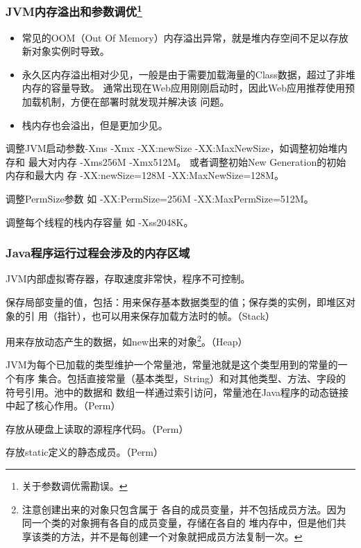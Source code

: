 \documentclass[hyperref={pdfpagelabels=false},compress,table]{beamer} %
\newcommand{\kai}{\CJKfamily{KaiTi}}
\def\Red{\color{red}}
\begin{document}
\begin{frame}[fragile] %
\frametitle{JVM内存溢出和参数调优\footnote{关于参数调优需勘误。}}

\begin{itemize}
\item 常见的OOM（Out Of Memory）内存溢出异常，就是堆内存空间不足以存放新对象实例时导致。
\item 永久区内存溢出相对少见，一般是由于需要加载海量的Class数据，超过了非堆内存的容量导致。
  通常出现在Web应用刚刚启动时，因此Web应用推荐使用预加载机制，方便在部署时就发现并解决该
  问题。
 \item 栈内存也会溢出，但是更加少见。
\end{itemize}

\begin{description}\scriptsize
\item[堆内存优化] 调整JVM启动参数-Xms -Xmx -XX:newSize -XX:MaxNewSize，如调整初始堆内存和
  最大对内存 -Xms256M -Xmx512M。 或者调整初始New Generation的初始内存和最大内
  存 -XX:newSize=128M -XX:MaxNewSize=128M。
 \item[永久区内存优化] 调整PermSize参数   如  -XX:PermSize=256M -XX:MaxPermSize=512M。
 \item[栈内存优化] 调整每个线程的栈内存容量  如  -Xss2048K。
\end{description}
\end{frame}

\begin{frame}[fragile] %
\frametitle{Java程序运行过程会涉及的内存区域}
\begin{description}\kai\small
\item[寄存器] JVM内部虚拟寄存器，存取速度非常快，程序不可控制。
\item[栈] 保存局部变量的值，包括：用来保存基本数据类型的值；保存类的实例，即堆区对象的引
  用（指针），也可以用来保存加载方法时的帧。（Stack）
\item[堆] 用来存放动态产生的数据，如new出来的对象\footnote{注意创建出来的对象只包含属于
    各自的成员变量，并不包括成员方法。因为同一个类的对象拥有各自的成员变量，存储在各自的
    堆内存中，但是他们共享该类的方法，并不是每创建一个对象就把成员方法复制一次。}。（Heap）
\item[常量池] JVM为每个已加载的类型维护一个常量池，常量池就是这个类型用到的常量的一个有序
  集合。包括直接常量（基本类型，String）和对其他类型、方法、字段的符号引用。池中的数据和
  数组一样通过索引访问，常量池在Java程序的动态链接中起了核心作用。（Perm）
\item[代码段] 存放从硬盘上读取的源程序代码。（Perm）
\item[数据段] 存放static定义的静态成员。{\Red （Perm）} 
\end{description}
\end{frame}
\end{document}

